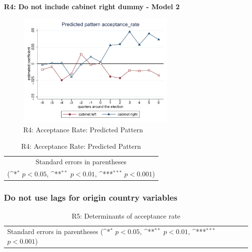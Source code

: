 \documentclass[10pt,a4paper]{scrartcl}
\begin{document}
\clearpage
\textbf{R4: Do not include cabinet right dummy - Model 2}
\begin{figure}[!ht]
	\centering
	\includegraphics[width=0.7\textwidth]{figures_edited/acceptance_rate_graph2_R4.pdf}
	\caption{R4: Acceptance Rate: Predicted Pattern}
\end{figure}

\begin{table}[!ht]\centering
	\footnotesize
	\renewcommand{\arraystretch}{1.2}
	\def\sym#1{\ifmmode^{#1}\else\(^{#1}\)\fi}
	\caption{R4: Acceptance Rate: Predicted Pattern}
	\begin{tabular}{l*{2}{c}}
		\hline\hline
		
		\hline\hline
		\multicolumn{3}{c}{\footnotesize Standard errors in parentheses} \\
		\multicolumn{3}{c}{\footnotesize (\sym{*} \(p<0.05\), \sym{**} \(p<0.01\), \sym{***} \(p<0.001\))} \\
	\end{tabular}
\end{table}





\clearpage
\FloatBarrier
\subsubsection{Do not use lags for origin country variables}
\begin{table}[!ht]\centering
	\renewcommand{\arraystretch}{1.25}
	\small
	\def\sym#1{\ifmmode^{#1}\else\(^{#1}\)\fi}
	\caption{R5: Determinants of acceptance rate}
	\begin{tabular}{l*{3}{c}}
		\hline\hline
		
		\hline\hline
		\multicolumn{4}{l}{\footnotesize Standard errors in parentheses (\sym{*} \(p<0.05\), \sym{**} \(p<0.01\), \sym{***} \(p<0.001\))}\\
	\end{tabular}
\end{table}
\end{document}
